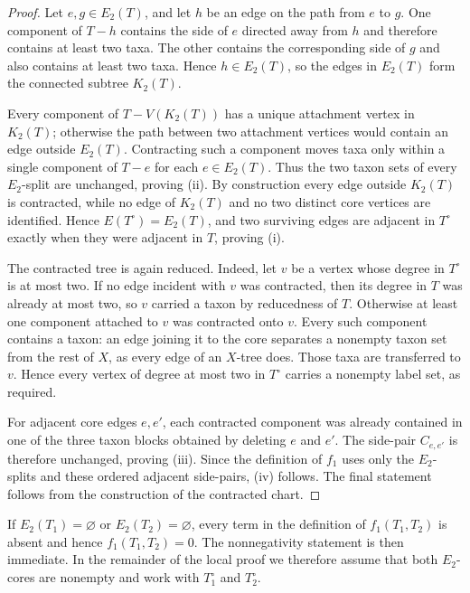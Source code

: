 \documentclass[11pt]{article}
\begin{document}
\begin{proof}
Let $e,g\in E_2(T)$, and let $h$ be an edge on the path from $e$ to $g$.
One component of $T-h$ contains the side of $e$ directed away from $h$ and
therefore contains at least two taxa.  The other contains the corresponding
side of $g$ and also contains at least two taxa.  Hence $h\in E_2(T)$, so the
edges in $E_2(T)$ form the connected subtree $K_2(T)$.

Every component of $T-V(K_2(T))$ has a unique attachment vertex in $K_2(T)$;
otherwise the path between two attachment vertices would contain an edge
outside $E_2(T)$.  Contracting such a component moves taxa only within a
single component of $T-e$ for each $e\in E_2(T)$.  Thus the two taxon sets of
every $E_2$-split are unchanged, proving \textup{(ii)}.  By construction every
edge outside $K_2(T)$ is contracted, while no edge of $K_2(T)$ and no two
distinct core vertices are identified.  Hence $E(T^\circ)=E_2(T)$, and two
surviving edges are adjacent in $T^\circ$ exactly when they were adjacent in
$T$, proving \textup{(i)}.

The contracted tree is again reduced.  Indeed, let $v$ be a vertex whose
degree in $T^\circ$ is at most two.  If no edge incident with $v$ was
contracted, then its degree in $T$ was already at most two, so $v$ carried a
taxon by reducedness of $T$.  Otherwise at least one component attached to
$v$ was contracted onto $v$.  Every such component contains a taxon: an edge
joining it to the core separates a nonempty taxon set from the rest of $X$,
as every edge of an $X$-tree does.  Those taxa are transferred to $v$.
Hence every vertex of degree at most two in $T^\circ$ carries a nonempty
label set, as required.

For adjacent core edges $e,e'$, each contracted component was already
contained in one of the three taxon blocks obtained by deleting $e$ and $e'$.
The side-pair $C_{e,e'}$ is therefore unchanged, proving \textup{(iii)}.
Since the definition of $f_1$ uses only the $E_2$-splits and these ordered
adjacent side-pairs, \textup{(iv)} follows.  The final statement follows from
the construction of the contracted chart.
\end{proof}

If $E_2(T_1)=\varnothing$ or $E_2(T_2)=\varnothing$, every term in the
definition of $f_1(T_1,T_2)$ is absent and hence $f_1(T_1,T_2)=0$.  The
nonnegativity statement is then immediate.  In the remainder of the local
proof we therefore assume that both $E_2$-cores are nonempty and work with
$T_1^\circ$ and $T_2^\circ$.
\end{document}
